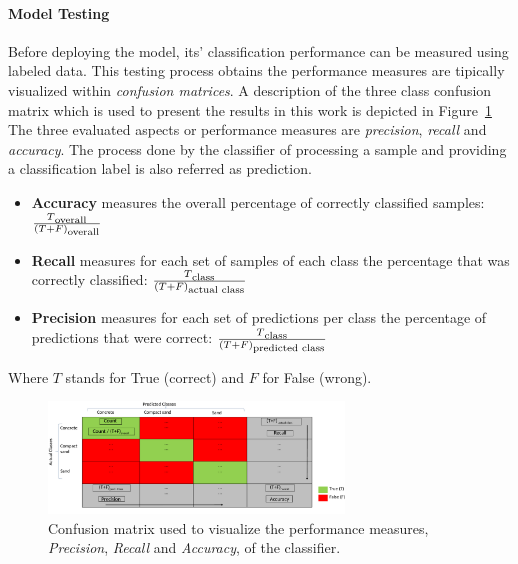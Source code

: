 \documentclass{article}
\begin{document}
\paragraph*{Model Testing}
Before deploying the model, its' classification performance can be measured using labeled data.
This testing process obtains the performance measures are tipically visualized within \emph{confusion matrices}. 
A description of the three class confusion matrix which is used to present the results in this work is depicted in Figure~\ref{fig:CMdescrpit}
The three evaluated aspects or performance measures are \emph{precision}, \emph{recall} and \emph{accuracy}.
The process done by the classifier of processing a sample and providing a classification label is also referred as prediction.
\begin{itemize}
\item \textbf{Accuracy} measures the overall percentage of correctly classified samples: $\frac{T\textsubscript{overall}}{(T+F)\textsubscript{overall}}$ 
\item \textbf{Recall} measures for each set of samples of each class the percentage that was correctly classified: $\frac{T\textsubscript{class}}{(T+F)\textsubscript{actual class}}$%
\item \textbf{Precision} measures for each set of predictions per class the percentage of predictions that were correct: $\frac{T\textsubscript{class}}{(T+F)\textsubscript{predicted class}}$%
\end{itemize}
Where $T$ stands for True (correct) and $F$ for False (wrong).

\begin{figure}[!htb]
    \centering
    \includegraphics[width=0.7\textwidth]{../figures/CM_Description.pdf}
    \caption{\label{fig:CMdescrpit} Confusion matrix used to visualize the performance measures, \emph{Precision}, \emph{Recall} and \emph{Accuracy}, of the classifier.\cite{kuhr2021}}
\end{figure}
\end{document}
